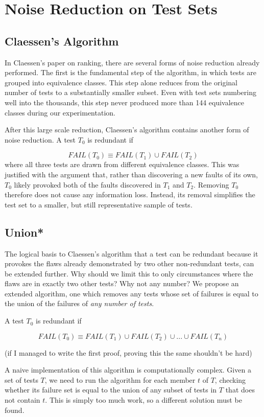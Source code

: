 \documentclass[11pt]{article}
\begin{document}
\section{Noise Reduction on Test Sets}
\subsection{Claessen's Algorithm}
In Claessen's paper on ranking, there are several forms of noise reduction already performed. The first is the fundamental step of the algorithm, in which tests are grouped into equivalence classes. This step alone reduces from the original number of tests to a substantially smaller subset. Even with test sets numbering well into the thousands, this step never produced more than 144 equivalence classes during our experimentation.

After this large scale reduction, Claessen's algorithm contains another form of noise reduction. A test $T_0$ is redundant if

$$FAIL (T_0) \equiv FAIL(T_1) \cup FAIL(T_2)$$
where all three tests are drawn from different equivalence classes. This was justified with the argument that, rather than discovering a new faults of its own, $T_0$ likely provoked both of the faults discovered in $T_1$ and $T_2$. Removing $T_0$ therefore does not cause any information loss. Instead, its removal simplifies the test set to a smaller, but still representative sample of tests.

\subsection{Union*}
The logical basis to Claessen's algorithm that a test can be redundant because it provokes the flaws already demonstrated by two other non-redundant tests\cite{Claessen}, can be extended further. Why should we limit this to only circumstances where the flaws are in exactly two other tests? Why not any number? We propose an extended algorithm, one which removes any tests whose set of failures is equal to the union of the failures of \emph{any number of tests}. 

A test $T_0$ is redundant if

$$FAIL (T_0) \equiv FAIL(T_1) \cup FAIL(T_2) \cup ... \cup FAIL(T_n) $$

(if I managed to write the first proof, proving this the same shouldn't be hard)

A naive implementation of this algorithm is computationally complex. Given a set of tests $T$, we need to run the algorithm for each member $t$ of $T$, checking whether its failure set is equal to the union of any subset of tests in $T$ that does not contain $t$. This is simply too much work, so a different solution must be found.
\end{document}
